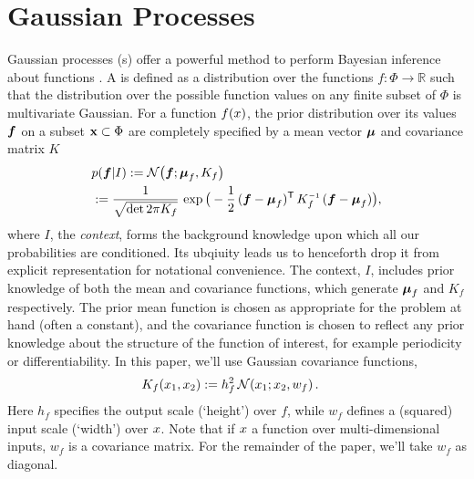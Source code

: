 \documentclass{article}
\begin{document}
\section{Gaussian Processes}
Gaussian processes (\gp s) offer a powerful method to perform Bayesian inference about functions \citep{GPsBook}. A \gpb is defined as a distribution over the functions $f: \Phi \rightarrow \mathbb{R}$ such that the distribution over the possible function values on any finite subset of $\Phi$ is multivariate Gaussian.  For a function $f(\lfv)$, the prior distribution over its values $\vf$ on a subset $\vlfv \subset \Phi$ are completely specified by a mean vector $\vmu$ and covariance matrix $K$
\begin{align*}%
\textstyle
 &\p{\vf}{I} \deq \N{\vf}{\vmu_{f}}{K_{f}}\\
 &\deq\frac{1}{\sqrt{\det{2\pi K_{f}}}}\,\exp \big(-\frac{1}{2}\,(\vf-\vmu_{f})\tra\,K_{f}\inv\,(\vf-\vmu_{f})\big),
\end{align*}
where $I$, the \emph{context}, forms the background knowledge upon which all our probabilities are conditioned. Its ubqiuity leads us to henceforth drop it from explicit representation for notational convenience. 
The context, $I$, includes prior knowledge of both the mean and covariance functions, which generate $\vmu_{f}$ and $K_{f}$ respectively. 
The prior mean function is chosen as appropriate for the problem at hand (often a constant), and the covariance function is chosen to reflect any prior knowledge about the
structure of the function of interest, for example periodicity or differentiability. In this paper, we'll use Gaussian covariance functions,
\begin{align} \label{eq:Gaussian_cov_fn}
\textstyle
K_{f}(\lfv_1,\lfv_2)& \deq h_f^2\,\N{\lfv_1}{\lfv_2}{w_{f}}.
\end{align} 
Here $h_f$ specifies the output scale (`height') over $f$, while $w_f$ defines a (squared) input scale (`width') over $\lfv$. Note that if $\lfv$ a function over multi-dimensional inputs, $w_f$ is a covariance matrix. For the remainder of the paper, we'll take $w_f$ as diagonal. 
\end{document}
